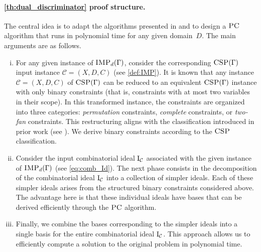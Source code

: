 \documentclass[11pt]{article}
\newcommand{\Cc}{\mathcal{C}}
\newcommand{\CSP}{\textsc{CSP}}
\newcommand{\IMP}{\textsc{IMP}}
\newcommand{\PC}{\textsc{PC}}
\newcommand{\I}{\emph{$\rm{I}$}}
\newcommand{\1}{\textbf{1}}
\newcommand{\GB}{\text{Gr\"{o}bner} }
\begin{document}
\paragraph{\cref{th:dual_discriminator} proof structure.}\label{sect:dual_discriminator_structure}
The central idea is to adapt the algorithms presented in \cite{BharathiM21, BharathiM25} and \cite{BulatovRSTOC22} to design a $\PC$ algorithm that runs in polynomial time for any given domain~$D$.
%
The main arguments are as follows.
\begin{enumerate}[(i)]
    \item For any given instance of $\IMP_d(\Gamma)$, consider the corresponding $\CSP(\Gamma)$ input instance $\Cc=(X,D,C)$ (see \cref{def:IMP}). It is known that any instance $\Cc = (X, D, C)$ of $\CSP(\Gamma)$ can be reduced to an equivalent $\CSP(\Gamma)$ instance with only binary constraints (that is, constraints with at most two variables in their scope). In this transformed instance, the constraints are organized into three categories: \emph{permutation} constraints, \emph{complete} constraints, or \emph{two-fan} constraints. This restructuring aligns with the classification introduced in prior work (see \cite{Cooper1994CharacterisingTC}). We derive binary constraints according to the $\CSP$ classification. \label{i}
    \item Consider the input combinatorial ideal $\I_\Cc$ associated with the given instance of $\IMP_d(\Gamma)$ (see \cref{eq:comb_Id}). The next phase consists in the decomposition of the combinatorial ideal $\I_{\Cc}$ into a collection of simpler ideals. Each of these simpler ideals arises from the structured binary constraints considered above. The advantage here is that these individual ideals have \GB bases that can be derived efficiently through the $\PC$ algorithm.
    \item Finally, we combine the \GB bases corresponding to the simpler ideals into a single \GB basis for the entire combinatorial ideal $\I_{\Cc}$. This approach allows us to efficiently compute a solution to the original problem in polynomial time.
\end{enumerate}
\end{document}
